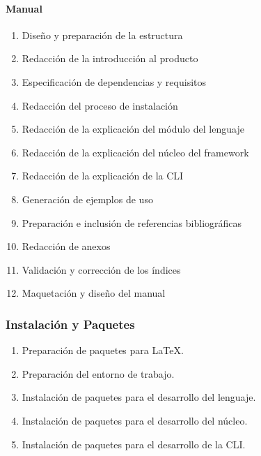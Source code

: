 \paragraph{Manual}
\begin{enumerate}
    \item Diseño y preparación de la estructura
    \item Redacción de la introducción al producto
    \item Especificación de dependencias y requisitos
    \item Redacción del proceso de instalación

    \item Redacción de la explicación del módulo del lenguaje
    \item Redacción de la explicación del núcleo del framework
    \item Redacción de la explicación de la CLI

    \item Generación de ejemplos de uso %

    \item Preparación e inclusión de referencias bibliográficas %
    \item Redacción de anexos %
    \item Validación y corrección de los índices %
    \item Maquetación y diseño del manual %

\end{enumerate}

\subsubsection{Instalación y Paquetes}
\begin{enumerate}
    \item Preparación de paquetes para LaTeX.
    \item Preparación del entorno de trabajo.
    \item Instalación de paquetes para el desarrollo del lenguaje.
    \item Instalación de paquetes para el desarrollo del núcleo.
    \item Instalación de paquetes para el desarrollo de la CLI.
\end{enumerate}



